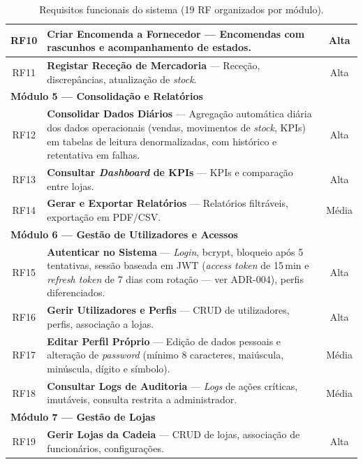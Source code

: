 \begin{table}[H]
\begin{tabular}{|c|p{11.5cm}|c|}
    \hline
    RF10 & \textbf{Criar Encomenda a Fornecedor} --- Encomendas com rascunhos e acompanhamento de estados. & Alta \\
    \hline
    RF11 & \textbf{Registar Receção de Mercadoria} --- Receção, discrepâncias, atualização de \textit{stock}. & Alta \\
    \hline
    \multicolumn{3}{|l|}{\cellcolor{gray!15}\textbf{Módulo 5 --- Consolidação e Relatórios}} \\
    \hline
    RF12 & \textbf{Consolidar Dados Diários} --- Agregação automática diária dos dados operacionais (vendas, movimentos de \textit{stock}, KPIs) em tabelas de leitura denormalizadas, com histórico e retentativa em falhas. & Alta \\
    \hline
    RF13 & \textbf{Consultar \textit{Dashboard} de KPIs} --- KPIs e comparação entre lojas. & Alta \\
    \hline
    RF14 & \textbf{Gerar e Exportar Relatórios} --- Relatórios filtráveis, exportação em PDF/CSV. & Média \\
    \hline
    \multicolumn{3}{|l|}{\cellcolor{gray!15}\textbf{Módulo 6 --- Gestão de Utilizadores e Acessos}} \\
    \hline
    RF15 & \textbf{Autenticar no Sistema} --- \textit{Login}, bcrypt, bloqueio após 5 tentativas, sessão baseada em JWT (\textit{access token} de 15\,min e \textit{refresh token} de 7 dias com rotação --- ver ADR-004), perfis diferenciados. & Alta \\
    \hline
    RF16 & \textbf{Gerir Utilizadores e Perfis} --- CRUD de utilizadores, perfis, associação a lojas. & Alta \\
    \hline
    RF17 & \textbf{Editar Perfil Próprio} --- Edição de dados pessoais e alteração de \textit{password} (mínimo 8 caracteres, maiúscula, minúscula, dígito e símbolo). & Média \\
    \hline
    RF18 & \textbf{Consultar Logs de Auditoria} --- \textit{Logs} de ações críticas, imutáveis, consulta restrita a administrador. & Média \\
    \hline
    \multicolumn{3}{|l|}{\cellcolor{gray!15}\textbf{Módulo 7 --- Gestão de Lojas}} \\
    \hline
    RF19 & \textbf{Gerir Lojas da Cadeia} --- CRUD de lojas, associação de funcionários, configurações. & Alta \\
    \hline
    \end{tabular}
    \caption{Requisitos funcionais do sistema (19 RF organizados por módulo).}
    \label{tab:rf}
    \end{table}

